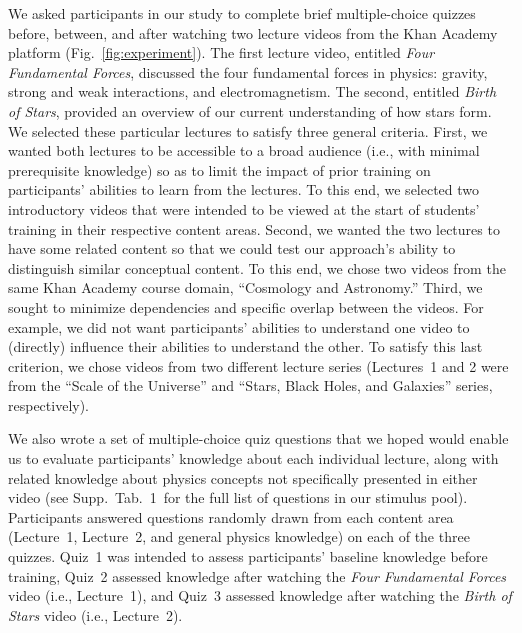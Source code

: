 \documentclass[10pt]{article}
\newcommand{\questions}{1}
\begin{document}
We asked participants in our study to complete brief multiple-choice quizzes
before, between, and after watching two lecture videos from the Khan
Academy~\citep{Khan04} platform (Fig.~\ref{fig:experiment}). The first lecture
video, entitled \textit{Four Fundamental Forces}, discussed the four
fundamental forces in physics: gravity, strong and weak interactions, and
electromagnetism. The second, entitled \textit{Birth of Stars}, provided an
overview of our current understanding of how stars form. We selected these
particular lectures to satisfy three general criteria. First, we wanted both
lectures to be accessible to a broad audience (i.e., with minimal prerequisite
knowledge) so as to limit the impact of prior training on participants'
abilities to learn from the lectures. To this end, we selected two introductory
videos that were intended to be viewed at the start of students' training in
their respective content areas. Second, we wanted the two lectures to have some
related content so that we could test our approach's ability to distinguish
similar conceptual content. To this end, we chose two videos from the same Khan
Academy course domain, ``Cosmology and Astronomy.'' Third, we sought to
minimize dependencies and specific overlap between the videos. For example, we
did not want participants' abilities to understand one video to (directly)
influence their abilities to understand the other. To satisfy this last
criterion, we chose videos from two different lecture series (Lectures~1 and 2
were from the ``Scale of the Universe'' and ``Stars, Black Holes, and
Galaxies'' series, respectively).

We also wrote a set of multiple-choice quiz questions that we hoped would
enable us to evaluate participants' knowledge about each individual lecture,
along with related knowledge about physics concepts not specifically presented
in either video (see Supp.~Tab.~\questions~for the full list of questions in
our stimulus pool). Participants answered questions randomly drawn from each
content area (Lecture~1, Lecture~2, and general physics knowledge) on each of
the three quizzes. Quiz~1 was intended to assess participants' baseline
knowledge before training, Quiz~2 assessed knowledge after watching the
\textit{Four Fundamental Forces} video (i.e., Lecture~1), and Quiz~3 assessed
knowledge after watching the \textit{Birth of Stars} video (i.e., Lecture~2).
\end{document}
